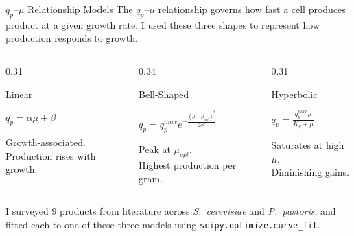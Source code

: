 \documentclass[aspectratio=169, 11pt]{beamer}
\begin{document}
\begin{frame}{$q_p$--$\mu$ Relationship Models}
  The $q_p$--$\mu$ relationship governs how fast a cell produces product at a given growth rate.
  I used these three shapes to represent how production responds to growth.

  \vspace{0.2cm}
  \begin{columns}[T]
    \begin{column}{0.31\textwidth}
      \begin{block}{Linear}
        \begin{center}
          $q_p = \alpha \mu + \beta$
        \end{center}
        \vspace{0.1cm}
        {\small Growth-associated.\\Production rises with growth.}
      \end{block}
    \end{column}
    \begin{column}{0.34\textwidth}
      \begin{block}{Bell-Shaped}
        \begin{center}
          $q_p = q_p^{max} e^{-\frac{(\mu - \mu_{opt})^2}{2\sigma^2}}$
        \end{center}
        \vspace{0.1cm}
        {\small Peak at $\mu_{opt}$.\\Highest production per gram.}
      \end{block}
    \end{column}
    \begin{column}{0.31\textwidth}
      \begin{block}{Hyperbolic}
        \begin{center}
          $q_p = \frac{q_p^{max} \mu}{K_q + \mu}$
        \end{center}
        \vspace{0.1cm}
        {\small Saturates at high $\mu$.\\Diminishing gains.}
      \end{block}
    \end{column}
  \end{columns}

  \vspace{0.3cm}
  {\small I surveyed 9 products from literature across \textit{S.\ cerevisiae} and \textit{P.\ pastoris},
  and fitted each to one of these three models using \texttt{scipy.optimize.curve\_fit}.}
\end{frame}
\end{document}
